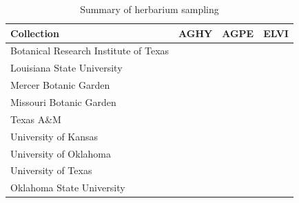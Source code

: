 \documentclass[11pt]{article}
\begin{document}
	
	
	\begin{table}[h]
		\caption{Summary of herbarium sampling}
		\label{Table:herbaria}
		\centering
		\begin{tabular}{llll}\hline
			Collection        & AGHY        & AGPE      &      ELVI\\ \hline
			Botanical Research Institute of Texas &      &    &        \\
			Louisiana State University &       &   &          \\
			Mercer Botanic Garden &       &      &     \\
			Missouri Botanic Garden&  & & \\
		    Texas A\&M &  & & \\
		    University of Kansas &  &&  \\
		    University of Oklahoma &  &&  \\
		    University of Texas     &  & & \\		    				 			     			     
			Oklahoma State University&       &       &   \\ \hline
		\end{tabular}
		\bigskip{}

	\end{table}
	
	
	
	
	


	
	\newpage{}
	

	
\end{document}
